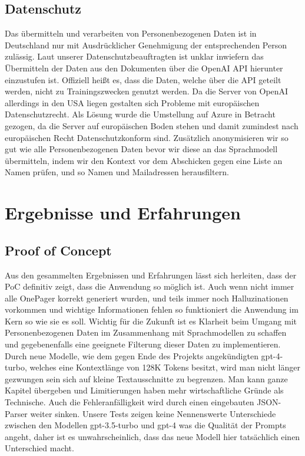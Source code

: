 \subsection{Datenschutz}
Das übermitteln und verarbeiten von Personenbezogenen Daten ist in Deutschland nur mit Ausdrücklicher Genehmigung der
entsprechenden Person zulässig. Laut unserer Datenschutzbeauftragten ist unklar inwiefern das Übermitteln der Daten aus
den Dokumenten über die OpenAI API hierunter einzustufen ist. Offiziell heißt es, dass die Daten, welche über die API
geteilt werden, nicht zu Trainingszwecken genutzt werden. Da die Server von OpenAI allerdings in den USA liegen
gestalten sich Probleme mit europäischen Datenschutzrecht. Als Lösung wurde die Umstellung auf Azure in Betracht
gezogen, da die Server auf europäischen Boden stehen und damit zumindest nach europäischen Recht Datenschutzkonform
sind. Zusätzlich anonymisieren wir so gut wie alle Personenbezogenen Daten bevor wir diese an das Sprachmodell
übermitteln, indem wir den Kontext vor dem Abschicken gegen eine Liste an Namen prüfen, und so Namen und Mailadressen
herausfiltern.

\section{Ergebnisse und Erfahrungen}

\subsection{Proof of Concept}
Aus den gesammelten Ergebnissen und Erfahrungen lässt sich herleiten, dass der PoC definitiv zeigt, dass die Anwendung
so möglich ist. Auch wenn nicht immer alle OnePager korrekt generiert wurden, und teils immer noch Halluzinationen
vorkommen und wichtige Informationen fehlen so funktioniert die Anwendung im Kern so wie sie es soll. Wichtig für die
Zukunft ist es Klarheit beim Umgang mit Personenbezogenen Daten im Zusammenhang mit Sprachmodellen zu schaffen und
gegebenenfalls eine geeignete Filterung dieser Daten zu implementieren. Durch neue Modelle, wie dem gegen Ende des
Projekts angekündigten gpt-4-turbo, welches eine Kontextlänge von 128K Tokens besitzt, wird man nicht länger gezwungen
sein sich auf kleine Textausschnitte zu begrenzen. Man kann ganze Kapitel übergeben und Limitierungen haben mehr
wirtschaftliche Gründe als Technische. Auch die Fehleranfälligkeit wird durch einen eingebauten JSON-Parser weiter
sinken. Unsere Tests zeigen keine Nennenswerte Unterschiede zwischen den Modellen gpt-3.5-turbo und gpt-4 was die
Qualität der Prompts angeht, daher ist es unwahrscheinlich, dass das neue Modell hier tatsächlich einen Unterschied
macht.

